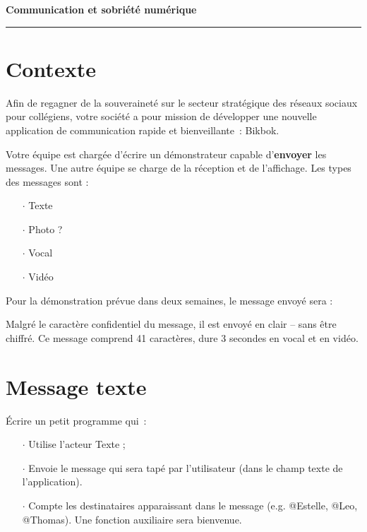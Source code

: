 \documentclass[a4paper]{article}
\begin{document}
\begin{center}
  \Large\bf Communication et sobriété numérique
\end{center}

\noindent\rule{\linewidth}{.6pt}

\section*{Contexte}

Afin de regagner de la souveraineté sur le secteur stratégique des réseaux sociaux pour collégiens, votre société a pour mission de développer une nouvelle application de communication rapide et bienveillante~: Bikbok.

Votre équipe est chargée d'écrire un démonstrateur capable d'\textbf{envoyer} les messages. Une autre équipe se charge de la réception et de l'affichage. Les types des messages sont :

\begin{itemize}[itemsep=0.2ex]
\item[$\cdot$] Texte
\item[$\cdot$] Photo ?
\item[$\cdot$] Vocal
\item[$\cdot$] Vidéo
\end{itemize}

Pour la démonstration prévue dans deux semaines, le message envoyé sera :

\smallskip
\centerline{}
\smallskip

Malgré le caractère confidentiel du message, il  est envoyé en clair -- sans être chiffré. Ce message comprend 41 caractères, dure 3 secondes en vocal et en vidéo.

\section{Message texte}

Écrire un petit programme qui~:

\begin{itemize}[itemsep=0.2ex]
\item[$\cdot$] Utilise l'acteur Texte ;
\item[$\cdot$] Envoie le message qui sera tapé par l'utilisateur (dans le champ texte de l'application).
\item[$\cdot$] Compte les destinataires apparaissant dans le message (e.g. @Estelle, @Leo, @Thomas). Une fonction auxiliaire sera bienvenue.
\end{itemize}
\end{document}
